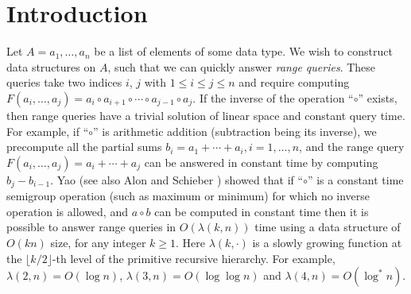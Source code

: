 \documentclass{llncs}
\begin{document}
\section{Introduction}
Let $A= a_1,\ldots,a_n$ be a list of elements of some data type. 
We wish to construct data structures on $A$, such that we can 
quickly answer {\it range queries}. These queries take two indices 
$i$, $j$ with $1 \leq i \leq j \leq n$ and require computing 
$F(a_i,\ldots,a_j)=a_i \circ a_{i+1} \circ \cdots \circ a_{j-1} \circ
a_{j}$. If the inverse of the operation ``$\circ$'' exists, 
then range queries have a trivial solution of linear space and 
constant query time. For example, if ``$\circ$'' is arithmetic
addition (subtraction being its inverse), we precompute all the partial 
sums $b_i = a_1 + \cdots +a_i, i=1,\ldots,n$, and the range query 
$F(a_i,\ldots,a_j)=a_i + \cdots + a_j$ can be answered in constant 
time by computing $b_j - b_{i-1}$. Yao \cite{yao82} 
(see also Alon and Schieber \cite{as87}) showed that if 
``$\circ$'' is a constant time semigroup operation (such as
maximum or minimum) for which 
no inverse operation is allowed, and $a \circ b$ can be computed 
in constant time then it is possible to answer range queries in 
$O(\lambda(k,n))$ time using a data structure of $O(kn)$ size, 
for any integer $k \ge 1$. Here $\lambda(k,\cdot)$ is a slowly 
growing function at the $\lfloor k/2 \rfloor$-th level of the 
primitive recursive hierarchy. For example, 
$\lambda(2,n) = O(\log n)$, $\lambda(3,n) =
O(\log \log n)$ and $\lambda(4,n) = O(\log^* n)$.
\end{document}
